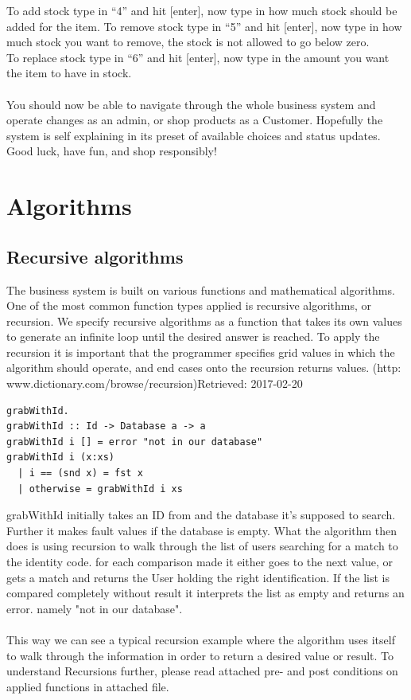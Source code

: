 \documentclass[11pt]{article}
\begin{document}
To add stock type in “4” and hit [enter], now type in how much stock should be added for the item.
To remove stock type in “5” and hit [enter], now type in how much stock you want to remove, the stock is not allowed to go below zero.\\
To replace stock type in “6” and hit [enter],  now type in the amount you want the item to have in stock.\\\\
You should now be able to navigate through the whole business system and operate changes as an admin, or shop products as a Customer. Hopefully the system is self explaining in its preset of available choices and status updates. Good luck, have fun, and shop responsibly!
\newpage
\section{Algorithms}
\subsection{Recursive algorithms}
The business system is built on various functions and mathematical algorithms. One of the most common function types applied is recursive algorithms, or recursion. We specify recursive algorithms as a function that takes its own values to generate an infinite loop until the desired answer is reached. To apply the recursion it is important that the programmer specifies grid values in which the algorithm should operate, and end cases onto the recursion returns values. (http:\\www.dictionary.com/browse/recursion)Retrieved: 2017-02-20 \\
\begin{lstlisting}
grabWithId.
grabWithId :: Id -> Database a -> a
grabWithId i [] = error "not in our database"
grabWithId i (x:xs)
  | i == (snd x) = fst x
  | otherwise = grabWithId i xs
\end{lstlisting}
grabWithId initially takes an ID from and the database it’s supposed to search. Further it makes fault values if the database is empty. What the algorithm then does is using recursion to walk through the list of users searching for a match to the identity code. for each comparison made it either goes to the next value, or gets a match and returns the User holding the right identification. If the list is compared completely without result it interprets the list as empty and returns an error. namely "not in our database".\\
\\
This way we can see a typical recursion example where the algorithm uses itself to walk through the information in order to return a desired value or result.
To understand Recursions further, please read attached pre- and post conditions on applied functions in attached file.\\
\end{document}
